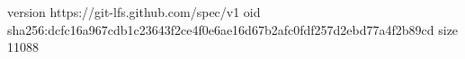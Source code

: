 version https://git-lfs.github.com/spec/v1
oid sha256:dcfc16a967cdb1c23643f2ce4f0e6ae16d67b2afc0fdf257d2ebd77a4f2b89cd
size 11088
